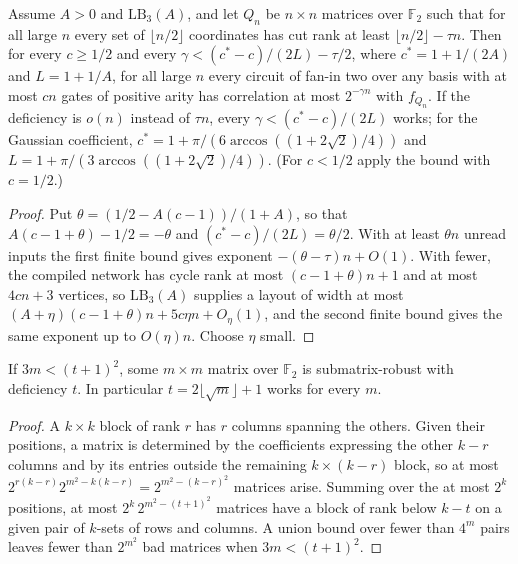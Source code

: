 \begin{theorem}
  \label{thm:lowerbounds-correlation-asymptotic}
  \leanok
  Assume $A>0$ and $\mathrm{LB}_3(A)$, and let $Q_n$ be $n\times n$ matrices over
  $\mathbb{F}_2$ such that for all large $n$ every set of $\lfloor n/2\rfloor$
  coordinates has cut rank at least $\lfloor n/2\rfloor-\tau n$. Then for every
  $c\ge1/2$ and every $\gamma<(c^*-c)/(2L)-\tau/2$, where $c^*=1+1/(2A)$ and
  $L=1+1/A$, for all large $n$ every circuit of fan-in two over any basis with at
  most $cn$ gates of positive arity has correlation at most $2^{-\gamma n}$ with
  $f_{Q_n}$. If the deficiency is $o(n)$ instead of $\tau n$, every
  $\gamma<(c^*-c)/(2L)$ works; for the Gaussian coefficient,
  $c^*=1+\pi/(6\arccos((1+2\sqrt2)/4))$ and $L=1+\pi/(3\arccos((1+2\sqrt2)/4))$.
  (For $c<1/2$ apply the bound with $c=1/2$.)
\end{theorem}
\begin{proof}
  \leanok
  Put $\theta=(1/2-A(c-1))/(1+A)$, so that $A(c-1+\theta)-1/2=-\theta$ and
  $(c^*-c)/(2L)=\theta/2$. With at least $\theta n$ unread inputs the first finite
  bound gives exponent $-(\theta-\tau)n+O(1)$. With fewer, the compiled network
  has cycle rank at most $(c-1+\theta)n+1$ and at most $4cn+3$ vertices, so
  $\mathrm{LB}_3(A)$ supplies a layout of width at most
  $(A+\eta)(c-1+\theta)n+5c\eta n+O_\eta(1)$, and the second finite bound gives the
  same exponent up to $O(\eta)n$. Choose $\eta$ small.
\end{proof}

\begin{lemma}
  \label{lem:lowerbounds-correlation-robust}
  \leanok
  If $3m<(t+1)^2$, some $m\times m$ matrix over $\mathbb{F}_2$ is
  submatrix-robust with deficiency $t$. In particular $t=2\lfloor\sqrt m\rfloor+1$
  works for every $m$.
\end{lemma}
\begin{proof}
  \leanok
  A $k\times k$ block of rank $r$ has $r$ columns spanning the others. Given
  their positions, a matrix is determined by the coefficients expressing the
  other $k-r$ columns and by its entries outside the remaining $k\times(k-r)$
  block, so at most $2^{r(k-r)}2^{m^2-k(k-r)}=2^{m^2-(k-r)^2}$ matrices arise.
  Summing over the at most $2^k$ positions, at most $2^k\,2^{m^2-(t+1)^2}$
  matrices have a block of rank below $k-t$ on a given pair of $k$-sets of rows
  and columns. A union bound over fewer than $4^m$ pairs leaves fewer than
  $2^{m^2}$ bad matrices when $3m<(t+1)^2$.
\end{proof}

